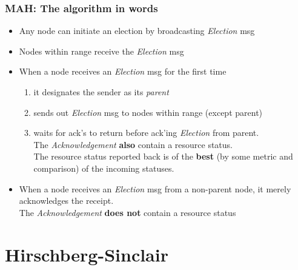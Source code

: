 \begin{frame}
  \frametitle{MAH: The algorithm in words}
  \begin{itemize}
  \item Any node can initiate an election by broadcasting \textit{Election} msg
  \item Nodes within range receive the \textit{Election} msg
  \item When a node receives an \textit{Election} msg for the first
    time
    \begin{enumerate}
    \item it designates the sender as its \textit{parent}
    \item sends out \textit{Election} msg to nodes within range (except parent)
    \item waits for ack's to return before ack'ing \textit{Election}
      from parent.\\ The \textit{Acknowledgement} \textbf{also}
      contain a resource status.\\ The resource status reported back
      is of the \textbf{best} (by some metric and comparison) of the
      incoming
      statuses.\\
    \end{enumerate}
  \item When a node receives an \textit{Election} msg from a
    non-parent node, it merely acknowledges the receipt.\\ The
    \textit{Acknowledgement} \textbf{does not} contain a resource status
  \end{itemize}
\end{frame}

\section[HS]{Hirschberg-Sinclair}


